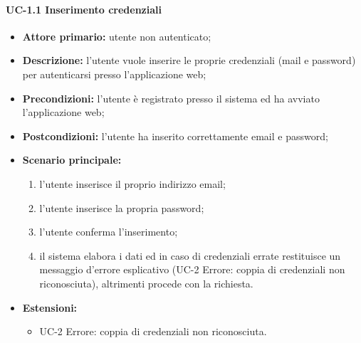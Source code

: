   \paragraph{UC-1.1 Inserimento credenziali}
  \begin{itemize}
    \item \textbf{Attore primario:} utente non autenticato;
  
    \item \textbf{Descrizione:} l'utente vuole inserire le proprie credenziali (mail e password) per autenticarsi presso l'applicazione web;
  
    \item \textbf{Precondizioni:} l'utente è registrato presso il sistema ed ha avviato l'applicazione web;
  
    \item \textbf{Postcondizioni:} l'utente ha inserito correttamente email e password;
  
    \item \textbf{Scenario principale:}
          \begin{enumerate}
            \item l'utente inserisce il proprio indirizzo email;
            \item l'utente inserisce la propria password;
            \item l'utente conferma l'inserimento;
            \item il sistema elabora i dati ed in caso di credenziali errate restituisce un messaggio d'errore esplicativo (UC-2 Errore: coppia di credenziali non riconosciuta), altrimenti procede con la richiesta.
          \end{enumerate}
    \item \textbf{Estensioni:}
      \begin{itemize}
            \item UC-2 Errore: coppia di credenziali non riconosciuta.
          \end{itemize}
  \end{itemize}

